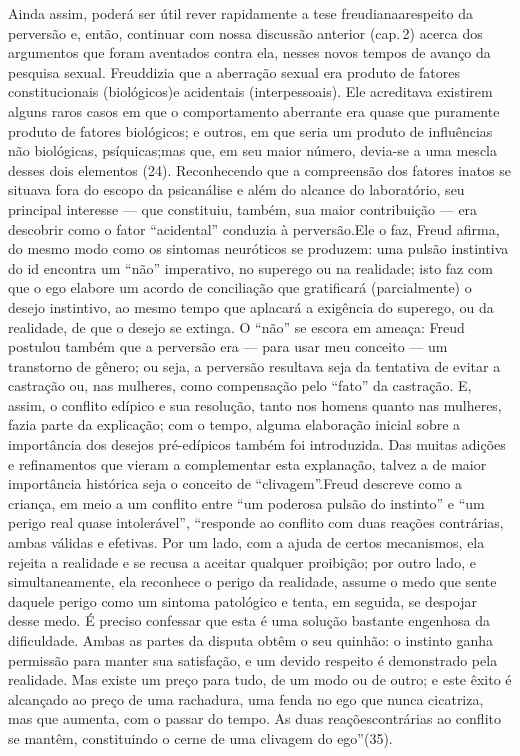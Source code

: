 Ainda assim, poderá ser útil rever rapidamente a tese freudiana\idxfreudaberr[|(] a\idxfeticfreu[|(]
respeito da perversão e, então, continuar com nossa discussão anterior
(cap.\,2) acerca dos argumentos que foram aventados contra ela, nesses
novos tempos de avanço da pesquisa sexual. Freud\idxfreudfetic[|(] dizia que a aberração
sexual era produto de fatores constitucionais (biológicos)\idxaberrbiol[|(] e acidentais\idxpervacide{}
(interpessoais). Ele acreditava existirem alguns raros casos em que o
comportamento aberrante era quase que puramente produto de fatores
biológicos; e outros, em que seria um produto de influências não
biológicas, psíquicas;\idxaberrbiol[|)] mas que, em seu maior número, devia-se a uma
mescla desses dois elementos (24). Reconhecendo que a compreensão dos
fatores inatos se situava fora do escopo da psicanálise e além do
alcance do laboratório, seu principal interesse --- que constituiu,
também, sua maior contribuição --- era descobrir como o fator
``acidental'' conduzia à perversão.\idxhost[|)] Ele o
faz, Freud afirma, do mesmo modo como os sintomas neuróticos se
produzem: uma pulsão instintiva do id encontra um
``não'' imperativo, no superego ou na
realidade; isto faz com que o ego elabore um acordo de conciliação\idxacor{} que
gratificará (parcialmente) o desejo instintivo, ao mesmo tempo que
aplacará a exigência do superego, ou da realidade, de que o desejo se
extinga. O ``não'' se escora em ameaça: Freud
postulou também que a perversão era --- para usar meu conceito --- um
transtorno de gênero; ou seja, a perversão resultava seja da tentativa
de evitar a castração ou, nas mulheres, como compensação pelo
``fato'' da castração. E, assim, o conflito
edípico e sua resolução, tanto nos homens quanto nas mulheres, fazia
parte da explicação; com o tempo, alguma elaboração inicial sobre a
importância dos desejos pré-edípicos\idxconfedese{} também foi introduzida. Das muitas
adições e refinamentos que vieram a complementar esta explanação,
talvez a de maior importância histórica seja o conceito de
``clivagem''.\idxconfcliv[|(] Freud descreve como a criança,
em meio a um conflito entre ``um poderosa pulsão do
instinto'' e ``um perigo real quase
intolerável'', ``responde ao conflito com duas reações contrárias, ambas
válidas e efetivas. Por um lado, com a ajuda de certos mecanismos, ela
rejeita a realidade e se recusa a aceitar qualquer proibição; por outro
lado, e simultaneamente, ela reconhece o perigo da realidade, assume o
medo que sente daquele perigo como um sintoma patológico e tenta, em
seguida, se despojar desse medo. É preciso confessar que esta é uma
solução bastante engenhosa da dificuldade. Ambas as partes da disputa
obtêm o seu quinhão: o instinto ganha permissão para manter sua
satisfação, e um devido respeito é demonstrado pela realidade. Mas
existe um preço para tudo, de um modo ou de outro; e este êxito é
alcançado ao preço de uma rachadura, uma fenda no ego que nunca
cicatriza, mas que aumenta, com o passar do tempo. As duas reações\idxpreedi[|)]
contrárias ao conflito se mantêm, constituindo o cerne de uma clivagem
do ego''\idxcliv[|(] (35).

